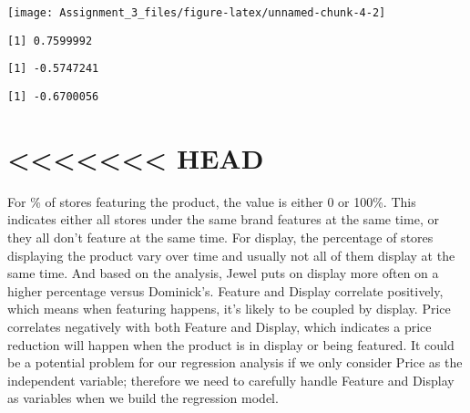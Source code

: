 \documentclass[]{article}
\newenvironment{Shaded}{\begin{snugshade}}{\end{snugshade}}
\newcommand{\CommentTok}[1]{\textcolor[rgb]{0.56,0.35,0.01}{\textit{#1}}}
\newcommand{\KeywordTok}[1]{\textcolor[rgb]{0.13,0.29,0.53}{\textbf{#1}}}
\newcommand{\NormalTok}[1]{#1}
\newcommand{\OperatorTok}[1]{\textcolor[rgb]{0.81,0.36,0.00}{\textbf{#1}}}
\begin{document}
\begin{center}\texttt{[image: Assignment\_3\_files/figure-latex/unnamed-chunk-4-2]} \end{center}

\begin{Shaded}
\end{Shaded}

\begin{verbatim}
[1] 0.7599992
\end{verbatim}

\begin{Shaded}
\end{Shaded}

\begin{verbatim}
[1] -0.5747241
\end{verbatim}

\begin{Shaded}
\end{Shaded}

\begin{verbatim}
[1] -0.6700056
\end{verbatim}

\hypertarget{head}{%
\section{\textless{}\textless{}\textless{}\textless{}\textless{}\textless{}\textless{}
HEAD}\label{head}}

For \% of stores featuring the product, the value is either 0 or 100\%.
This indicates either all stores under the same brand features at the
same time, or they all don't feature at the same time. For display, the
percentage of stores displaying the product vary over time and usually
not all of them display at the same time. And based on the analysis,
Jewel puts on display more often on a higher percentage versus
Dominick's. Feature and Display correlate positively, which means when
featuring happens, it's likely to be coupled by display. Price
correlates negatively with both Feature and Display, which indicates a
price reduction will happen when the product is in display or being
featured. It could be a potential problem for our regression analysis if
we only consider Price as the independent variable; therefore we need to
carefully handle Feature and Display as variables when we build the
regression model.
\end{document}
